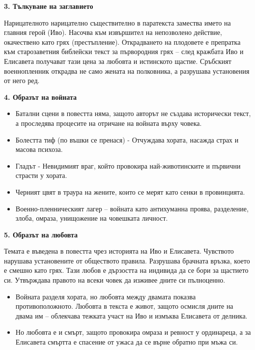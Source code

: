\documentclass[12pt,a4paper]{article}
\begin{document}
\vspace{0.1cm}
\textbf{3. Тълкуване на заглавието}
\vspace{0.1cm}

\indent Нарицателното нарицателно съществително в паратекста замества името на главния герой (Иво). Насочва към извършител на непозволено действие, окачествено като грях (престъпление). Открадването на плодовете е препратка към старозаветния библейски текст за първородния грях – след кражбата Иво и Елисавета получават тази цена за любовта и истинското щастие. Сръбският военнопленник открадва не само жената на полковника, а разрушава установения от него ред.

\vspace{0.1cm}
\textbf{4. Образът на войната}
\vspace{0.1cm}
\begin{itemize}[leftmargin=*, noitemsep, topsep=2pt, parsep=0pt]
    \item Батални сцени в повестта няма, защото авторът не създава исторически текст, а проследява процесите на отричане на войната върху човека.
\vspace{0.1cm}
    \item Болестта тиф (по въшки се пренася) - Отчуждава хората, насажда страх и масова психоза.
\vspace{0.1cm}
    \item Гладът - Невидимият враг, който провокира най-животинските и първични страсти у хората.
\vspace{0.1cm}
    \item Черният цвят в траура на жените, които се мерят като сенки в провинцията.
\vspace{0.1cm}
    \item Военно-пленническият лагер – войната като антихуманна проява, разделение, злоба, омраза, унищожение на човешката личност.
\end{itemize}

\vspace{0.1cm}
\textbf{5. Образът на любовта}
\vspace{0.1cm}

\indent Темата е въведена в повестта чрез историята на Иво и Елисавета. Чувството нарушава установените от обществото правила. Разрушава брачната връзка, което е смешно като грях. Тази любов е дързостта на индивида да се бори за щастието си. Утвърждава правото на всеки човек да изживее дните си пълноценно.

\vspace{0.1cm}
\begin{itemize}[leftmargin=*, noitemsep, topsep=2pt, parsep=0pt]
    \item Войната разделя хората, но любовта между двамата показва противоположното. Любовта в текста е живот, защото осмисля дните на двама им – облекчава тежката участ на Иво и измъква Елисавета от делника.
\vspace{0.1cm}
    \item Но любовта е и смърт, защото провокира омраза и ревност у ординареца, а за Елисавета смъртта е спасение от ужаса да се върне обратно при мъжа си.
\end{itemize}
\end{document}
